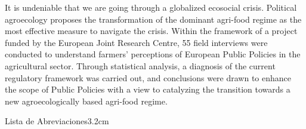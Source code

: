 \documentclass[a4paper, nobind]{templates/ociamthesis}
\begin{document}
\begin{romanpages}

\renewcommand{\abstractsecondtitle}{Abstract}
\begin{abstractsecond}
	\setlength{\baselineskip}{30pt}

It is undeniable that we are going through a globalized ecosocial crisis. Political agroecology proposes the transformation of the dominant agri-food regime as the most effective measure to navigate the crisis. Within the framework of a project funded by the European Joint Research Centre, 55 field interviews were conducted to understand farmers' perceptions of European Public Policies in the agricultural sector. Through statistical analysis, a diagnosis of the current regulatory framework was carried out, and conclusions were drawn to enhance the scope of Public Policies with a view to catalyzing the transition towards a new agroecologically based agri-food regime.
\end{abstractsecond}


\renewcommand\listfigurename{Lista de Figuras}   %
\renewcommand\listtablename{Lista de Tablas}


\dominitoc %

\flushbottom

\renewcommand{\contentsname}{Índice}

\tableofcontents

\listoffigures
	\mtcaddchapter

\listoftables
  \mtcaddchapter
\begin{mclistof}{Lista de Abreviaciones}{3.2cm}


\end{mclistof}
\end{romanpages}
\end{document}
